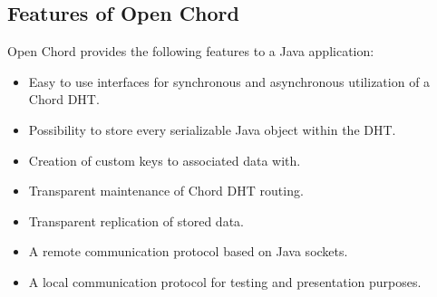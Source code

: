 \subsection{Features of Open Chord}
Open Chord provides the following features to a Java application: 
\begin{itemize}
\vspace{-0.5cm}
\setlength\itemsep{-1ex}
\item Easy to use interfaces for synchronous and asynchronous utilization of 
a Chord \cite{stoica01chord} DHT. 
\item Possibility to store every serializable Java object within the DHT. 
\item Creation of custom keys to associated data with. 
\item Transparent maintenance of Chord DHT routing. 
\item Transparent replication of stored data. 
\item A remote communication protocol based on Java sockets. 
\item A local communication protocol for testing and presentation 
purposes. 
\end{itemize}